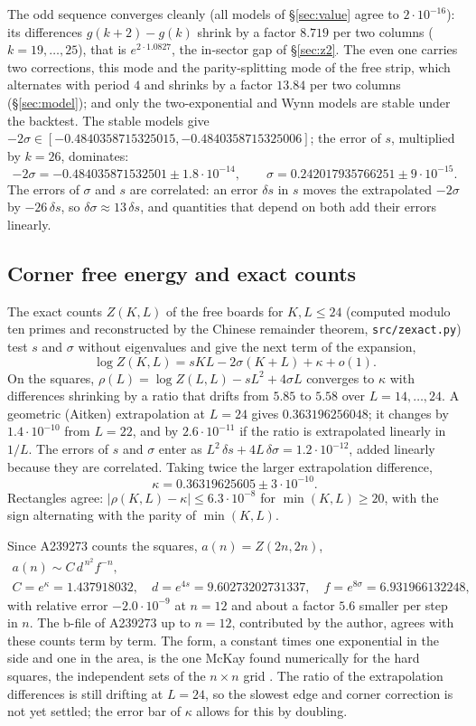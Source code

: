 \documentclass[11pt]{amsart}
\theoremstyle{definition}
\theoremstyle{remark}
\newcommand{\file}[1]{\texttt{#1}}
\begin{document}
The odd sequence converges cleanly (all models of \S\ref{sec:value} agree to $2\cdot10^{-16}$): its
differences $g(k+2) - g(k)$ shrink by a factor $8.719$ per two columns ($k = 19, \dots, 25$), that
is $e^{2 \cdot 1.0827}$, the in-sector gap of \S\ref{sec:z2}. The even one carries two corrections,
this mode and the parity-splitting mode of the free strip, which alternates with period $4$ and
shrinks by a factor $13.84$ per two columns (\S\ref{sec:model}); and only the two-exponential and Wynn models are stable under the
backtest. The stable models give $-2\sigma \in [-0.4840358715325015, -0.4840358715325006]$; the
error of $s$, multiplied by $k = 26$, dominates:
\[
  -2\sigma = -0.484035871532501 \pm 1.8\cdot10^{-14}, \qquad
  \sigma = 0.242017935766251 \pm 9\cdot10^{-15}.
\]
The errors of $\sigma$ and $s$ are correlated: an error $\delta s$ in $s$ moves the extrapolated
$-2\sigma$ by $-26\,\delta s$, so $\delta\sigma \approx 13\,\delta s$, and quantities that depend on
both add their errors linearly.

\subsection{Corner free energy and exact counts}\label{sec:corner}
The exact counts $Z(K, L)$ of the free boards for $K, L \le 24$ (computed modulo ten primes and
reconstructed by the Chinese remainder theorem, \file{src/zexact.py}) test $s$ and $\sigma$
without eigenvalues and give the next term of the expansion,
\[
  \log Z(K, L) = sKL - 2\sigma(K + L) + \kappa + o(1).
\]
On the squares, $\rho(L) = \log Z(L, L) - sL^2 + 4\sigma L$ converges to $\kappa$ with
differences shrinking by a ratio that drifts from $5.85$ to $5.58$ over $L = 14, \dots, 24$. A
geometric (Aitken) extrapolation at $L = 24$ gives $0.363196256048$; it changes by
$1.4\cdot10^{-10}$ from $L = 22$, and by $2.6\cdot10^{-11}$ if the ratio is extrapolated linearly in
$1/L$. The errors of $s$ and $\sigma$ enter as $L^2\,\delta s + 4L\,\delta\sigma = 1.2\cdot10^{-12}$,
added linearly because they are correlated. Taking twice the larger extrapolation difference,
\[
  \kappa = 0.36319625605 \pm 3\cdot10^{-10}.
\]
Rectangles agree: $|\rho(K, L) - \kappa| \le 6.3\cdot10^{-8}$ for $\min(K, L) \ge 20$, with the
sign alternating with the parity of $\min(K, L)$.

Since A239273 counts the squares, $a(n) = Z(2n, 2n)$,
\begin{gather*}
  a(n) \sim C\, d^{\,n^2} f^{-n},\\
  C = e^\kappa = 1.437918032, \quad d = e^{4s} = 9.60273202731337, \quad f = e^{8\sigma} = 6.931966132248,
\end{gather*}
with relative error $-2.0\cdot10^{-9}$ at $n = 12$ and about a factor $5.6$ smaller per step in $n$.
The b-file of A239273 up to $n = 12$, contributed by the author, agrees with these counts term by term.
The form, a constant times one exponential in the side and one in the area, is the one McKay found
numerically for the hard squares, the independent sets of the $n \times n$ grid \cite{oeisA006506}.
The ratio of the extrapolation differences is still drifting at $L = 24$, so the slowest edge and
corner correction is not yet settled; the error bar of $\kappa$ allows for this by doubling.
\end{document}
